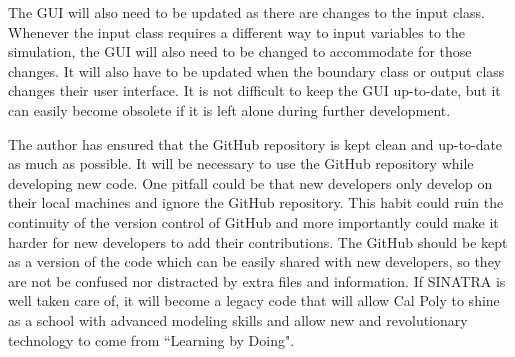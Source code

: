 \indent The GUI will also need to be updated as there are changes to the input class. Whenever the input class requires a different way to input variables to the simulation, the GUI will also need to be changed to accommodate for those changes. It will also have to be updated when the boundary class or output class changes their user interface. It is not difficult to keep the GUI up-to-date, but it can easily become obsolete if it is left alone during further development. \par

\indent The author has ensured that the GitHub\textsuperscript{\textregistered} repository is kept clean and up-to-date as much as possible. It will be necessary to use the GitHub\textsuperscript{\textregistered} repository while developing new code. One pitfall could be that new developers only develop on their local machines and ignore the GitHub\textsuperscript{\textregistered} repository. This habit could ruin the continuity of the version control of GitHub\textsuperscript{\textregistered} and more importantly could make it harder for new developers to add their contributions. The GitHub\textsuperscript{\textregistered} should be kept as a version of the code which can be easily shared with new developers, so they are not be confused nor distracted by extra files and information. If SINATRA is well taken care of, it will become a legacy code that will allow Cal Poly to shine as a school with advanced modeling skills and allow new and revolutionary technology to come from ``Learning by Doing".




